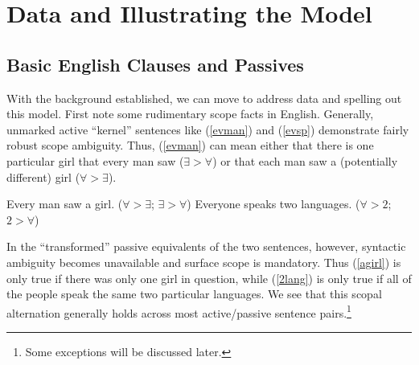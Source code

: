 \documentclass{article}
\begin{document}
\section{Data and Illustrating the Model}

\subsection{Basic English Clauses and Passives\label{eng}}

With the background established, we can move to address data and spelling out this model.
First note some rudimentary scope facts in English.
Generally, unmarked active ``kernel'' sentences like (\ref{evman}) and (\ref{evsp}) demonstrate fairly robust scope ambiguity.
Thus, (\ref{evman}) can mean either that there is one particular girl that every man saw ($\exists>\forall$) or that each man saw a (potentially different) girl ($\forall>\exists$).

\begin{exe}
\ex\label{first}{\begin{xlist}
\ex Every man saw a girl. \hfill ($\forall > \exists$; $\exists >  \forall$)\label{evman}
\ex Everyone speaks two languages. \hfill ($\forall > 2$; $2 > \forall$)\label{evsp}
\end{xlist}}
\end{exe}

In the ``transformed'' passive equivalents of the two sentences, however, syntactic ambiguity becomes unavailable and surface scope is mandatory.
Thus (\ref{agirl}) is only true if there was only one girl in question, while (\ref{2lang}) is only true if all of the people speak the same two particular languages.
We see that this scopal alternation generally holds across most active/passive sentence pairs.\footnote{Some exceptions will be discussed later.}

\begin{exe}
\end{exe}
\end{document}
